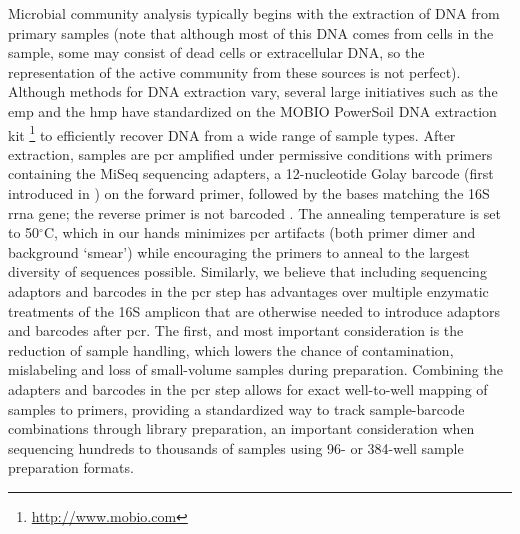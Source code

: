 Microbial community analysis typically begins with the extraction of DNA from primary
samples (note that although most of this DNA comes from cells in the sample, some may
consist of dead cells or extracellular DNA, so the representation of the active community
from these sources is not perfect). Although methods for DNA extraction vary, several
large initiatives such as the \gls{emp} \cite{Gilbert2010} and the \gls{hmp}
\cite{TheHumanMicrobiomeProjectConsortium2012, Consortium2012, Turnbaugh2007} have
standardized on the MOBIO PowerSoil DNA extraction kit \footnote{\url{http://www.mobio.com}}
to efficiently recover DNA from a wide range of sample types. After extraction, samples are
\gls{pcr} amplified under permissive conditions with primers containing the MiSeq sequencing
adapters, a 12-nucleotide Golay barcode (first introduced in \cite{Fierer2008}) on the forward
primer, followed by the bases matching the 16S \gls{rrna} gene; the reverse primer is not
barcoded \cite{Caporaso2012}. The annealing temperature is set to 50$^{\circ}$C, which in our
hands minimizes \gls{pcr} artifacts (both primer dimer and background ‘smear’) while encouraging
the primers to anneal to the largest diversity of sequences possible. Similarly, we believe that
including sequencing adaptors and barcodes in the \gls{pcr} step has advantages over multiple
enzymatic treatments of the 16S amplicon that are otherwise needed to introduce adaptors and
barcodes after \gls{pcr}. The first, and most important consideration is the reduction of sample
handling, which lowers the chance of contamination, mislabeling and loss of small-volume samples
during preparation. Combining the adapters and barcodes in the \gls{pcr} step allows for exact
well-to-well mapping of samples to primers, providing a standardized way to track sample-barcode
combinations through library preparation, an important consideration when sequencing hundreds to
thousands of samples using 96- or 384-well sample preparation formats.

